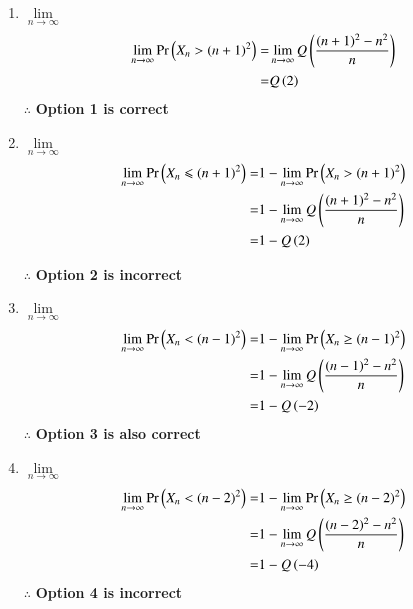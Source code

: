 \documentclass[journal,12pt,twocolumn]{IEEEtran}
\begin{document}
{
\begin{enumerate}
\item $\lim \limits_{n \to \infty} $ 
\begin{align}
    \lim \limits_{n \to \infty} \Pr\left(X_n > (n+1)^2\right) =& \lim \limits_{n \to \infty}Q \left(\frac{(n+1)^2-n^2}{n}\right)
    \\=&Q\left(2\right)
\end{align}
$\mathbf{\therefore}$ \textbf{Option 1 is correct}
\vspace{0.4cm}
\item $\lim \limits_{n \to \infty} $ 
\begin{align}
    \lim \limits_{n \to \infty}  \Pr\left(X_n \leqslant (n+1)^2\right) =&1-\lim \limits_{n \to \infty}  \Pr\left(X_n > (n+1)^2\right)
    \\=&1- \lim \limits_{n \to \infty}Q \left(\frac{(n+1)^2-n^2}{n}\right)
    \\=&1- Q \left(2\right)
\end{align}

$\mathbf{\therefore}$ \textbf{Option 2 is incorrect}
\vspace{4pt}
\item $\lim \limits_{n \to \infty} $ 
\begin{align}
    \lim \limits_{n \to \infty}  \Pr\left(X_n < (n-1)^2\right) =& 1-\lim \limits_{n \to \infty}  \Pr\left(X_n \geq (n-1)^2\right)
    \\=&1-\lim \limits_{n \to \infty}Q \left(\frac{(n-1)^2-n^2}{n}\right)
    \\=& 1-Q \left(-2\right)
\end{align}
$\mathbf{\therefore}$ \textbf{Option 3 is also correct}
\vspace{0.4cm}
\item $\lim \limits_{n \to \infty} $ 
\begin{align}
    \lim \limits_{n \to \infty}  \Pr\left(X_n < (n-2)^2\right) =& 1-\lim \limits_{n \to \infty}  \Pr\left(X_n \geq (n-2)^2\right)
    \\=&1-\lim \limits_{n \to \infty}Q \left(\frac{(n-2)^2-n^2}{n}\right)
    \\=&1- Q \left(-4\right)
\end{align}
$\mathbf{\therefore}$ \textbf{Option 4 is incorrect}
\end{enumerate}
}%
\end{document}
